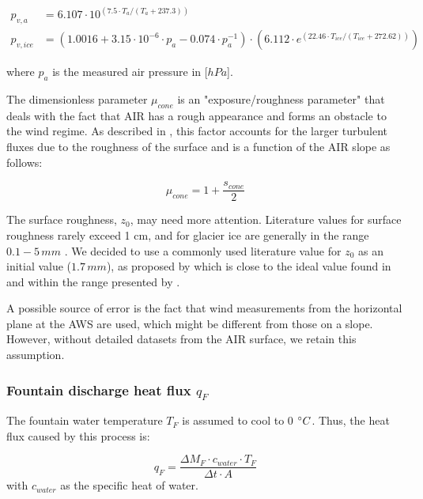 \documentclass[utf8]{frontiersSCNS} %
\begin{document}
\begin{equation} \begin{split} p_{v,a}&=6.107 \cdot 10^{(7.5 \cdot T_a / (T_a + 237.3))}\\ p_{v,ice}&=(1.0016 +
		3.15\cdot10^{-6}\cdot p_{a}-0.074\cdot p_{a}^{-1})\cdot(6.112 \cdot e^{(22.46 \cdot T_{ice} / (T_{ice} + 272.62))})
	\end{split} \label{eqn:vp} \end{equation}

where $p_{a}$ is the measured air pressure in [$hPa$].

The dimensionless parameter $\mu_{cone}$ is an "exposure/roughness parameter" that deals with the fact that AIR has a
rough appearance and forms an obstacle to the wind regime. As described in \cite{Oerlemans_2021}, this factor accounts
for the larger turbulent fluxes due to the roughness of the surface and is a function of the AIR slope as follows:

\begin{equation}
	\mu_{cone} = 1 + \frac{s_{cone}}{2}
\end{equation}

The surface roughness, $z_{0}$, may need more attention. Literature values for surface roughness rarely exceed 1 cm, and
for glacier ice are generally in the range $0.1-5\, mm$ \citet{BrockWillisSharp_2006}. We decided to use a commonly used
literature value for $z_{0}$ as an initial value ($1.7\,mm$), as proposed by \cite{CuffeyPaterson_2010} which is close to
the ideal value found in \cite{reid_brock_2014} and within the range presented by \cite{BrockWillisSharp_2006}.

A possible source of error is the fact that wind measurements from the horizontal plane at the AWS are used, which might
be different from those on a slope. However, without detailed datasets from the AIR surface, we retain this
assumption.

\subsubsection{Fountain discharge heat flux \texorpdfstring{$q_{F}$}{Lg} }
The fountain water temperature $T_F$ is assumed to cool to 0 $\degree C$. Thus, the heat flux caused by this
process is:

\begin{equation}
	q_{F} = \frac{ \Delta M_F \cdot c_{water} \cdot T_F}{\Delta t \cdot A}
	\label{eqn:qF}
\end{equation}
with $c_{water}$ as the specific heat of water.
\end{document}
